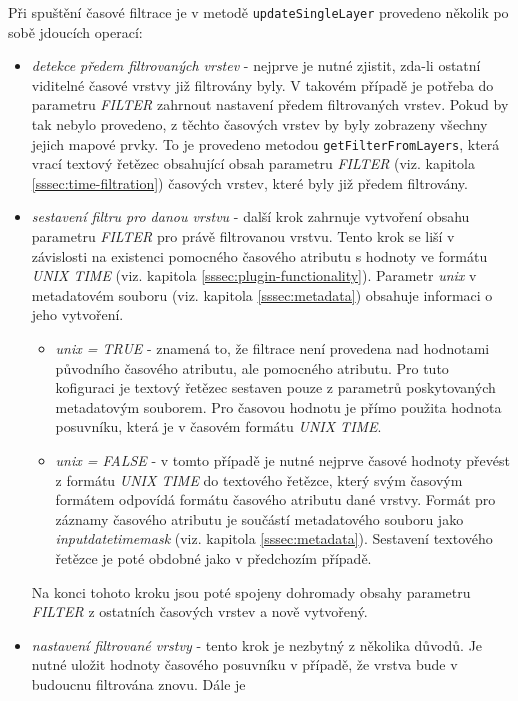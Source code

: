 Při spuštění časové filtrace je v metodě \verb|updateSingleLayer|
provedeno několik po sobě jdoucích operací:
\begin{itemize}
\item\textit{detekce předem filtrovaných vrstev} - nejprve je
nutné zjistit, zda-li ostatní viditelné časové vrstvy již
filtrovány byly. V takovém případě je potřeba do parametru
\textit{FILTER} zahrnout nastavení předem filtrovaných
vrstev. Pokud by tak nebylo provedeno, z těchto časových
vrstev by byly zobrazeny všechny jejich mapové prvky. To
je provedeno metodou \verb|getFilterFromLayers|, která vrací
textový řetězec obsahující obsah parametru \textit{FILTER}
(viz. kapitola \ref{sssec:time-filtration}) časových vrstev,
které byly již předem filtrovány.
\item\textit{sestavení filtru pro danou vrstvu} - další krok
zahrnuje vytvoření obsahu parametru \textit{FILTER} pro právě
filtrovanou vrstvu. Tento krok se liší v závislosti na existenci
pomocného časového atributu s hodnoty ve formátu \textit{UNIX
TIME} (viz. kapitola \ref{sssec:plugin-functionality}). Parametr
\textit{unix} v metadatovém souboru (viz. kapitola
\ref{sssec:metadata}) obsahuje informaci o jeho vytvoření.
\begin{itemize}
\item\textit{unix = TRUE} - znamená to, že filtrace není
provedena nad hodnotami původního časového atributu, ale
pomocného atributu. Pro tuto kofiguraci je textový řetězec
sestaven pouze z parametrů poskytovaných metadatovým
souborem. Pro časovou hodnotu je přímo použita hodnota
posuvníku, která je v časovém formátu \textit{UNIX TIME}.
\item\textit{unix = FALSE} - v tomto případě je
nutné nejprve časové hodnoty převést z formátu
\textit{UNIX TIME} do textového řetězce, který
svým časovým formátem odpovídá formátu časového
atributu dané vrstvy. Formát pro záznamy časového
atributu je součástí metadatového souboru jako
\textit{input\textunderscore datetime\textunderscore mask}
(viz. kapitola \ref{sssec:metadata}). Sestavení textového
řetězce je poté obdobné jako v předchozím případě.
\end{itemize}
Na konci tohoto kroku jsou poté spojeny dohromady obsahy parametru
\textit{FILTER} z ostatních časových vrstev a nově vytvořený.
\item\textit{nastavení filtrované vrstvy} - tento krok je nezbytný
z několika důvodů. Je nutné uložit hodnoty časového posuvníku
v případě, že vrstva bude v budoucnu filtrována znovu. Dále je

\end{itemize}
